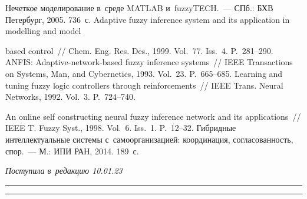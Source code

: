 \begin{multicols}{2}
{{\begin{thebibliography}{99}
   Нечеткое моделирование в~среде MATLAB и~fuzzyTECH.~--- СПб.: 
БХВ Петербург, 2005. 736~с.
   Adaptive fuzzy inference system and its application in 
modelling and model\linebreak\vspace*{-12pt}

\pagebreak

\noindent
 based control~// Chem. Eng. Res. Des., 1999. Vol.~77. 
Iss.~4. P.~281--290.
   ANFIS: Adaptive-network-based fuzzy inference systems~// IEEE 
Transactions on Systems, Man, and Cybernetics, 1993. Vol.~23. P.~665--685.
   Learning and tuning fuzzy logic controllers through 
reinforcements~// IEEE Trans. Neural Networks, 1992. Vol.~3. P.~724--740.


   An online self constructing neural fuzzy inference network and its 
applications~// IEEE T. Fuzzy Syst., 1998. Vol.~6. Iss.~1. P.~12--32.
   Гиб\-рид\-ные интеллектуальные 
сис\-те\-мы с~самоорганизацией: координация, согласованность, спор.~--- М.: ИПИ РАН, 2014. 
189~с.

\end{thebibliography}

 }
 }

\end{multicols}

\vspace*{-6pt}

\hfill{\footnotesize\textit{Поступила в~редакцию 10.01.23}}

\vspace*{8pt}




\hrule

\vspace*{2pt}

\hrule


\def\tit{FUZZY RULES BASED METHOD FOR~AGENT CONFLICT 
MANAGEMENT IN~HYBRID INTELLIGENT MULTIAGENT 
SYSTEMS}


